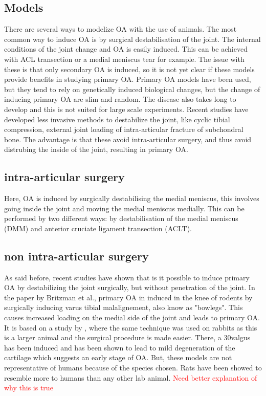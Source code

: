 \subsection{Models \cite{OA1} \cite{OA2}}

There are several ways to modelize OA with the use of animals. The most common way to induce OA is by surgical destabilisation of the joint. The internal conditions of the joint change and OA is easily induced. This can be achieved with ACL transection or a medial meniscus tear for example. The issue with these is that only secondary OA is induced, so it is not yet clear if these models provide benefits in studying primary OA. Primary OA models have been used, but they tend to rely on genetically induced biological changes, but the change of inducing primary OA are slim and random. The disease also takes long to develop and this is not suited for large scale experiments. Recent studies have developed less invasive methods to destabilize the joint, like cyclic tibial compression, external joint loading of intra-articular fracture of subchondral bone. The advantage is that these avoid intra-articular surgery, and thus avoid distrubing the inside of the joint, resulting in primary OA.

\subsection{intra-articular surgery\cite{OA2}}

Here, OA is induced by surgically destabilising the medial meniscus, this involves going inside the joint and moving the medial meniscus medially. This can be performed by two different ways: by destabilisation of the medial meniscus (DMM) and anterior cruciate ligament transection (ACLT). \cite{DMM}


\subsection{non intra-articular surgery\cite{OA1}}

As said before, recent studies have shown that is it possible to induce primary OA by destabilizing the joint surgically, but without penetration of the joint. In the paper by Britzman et al., primary OA in induced in the knee of rodents by surgically inducing varus tibial malalignement, also know as "bowlegs". This causes increased loading on the medial side of the joint and leads to primary OA. It is based on a study by \cite{rabbitOA}, where the same technique was used on rabbits as this is a larger animal and the surgical procedure is made easier. There, a 30\degree valgus has been induced and has been shown to lead to mild degeneration of the cartilage which suggests an early stage of OA. But, these models are not representative of humans because of the species chosen. Rats have been showed to resemble more to humans than any other lab animal. \textcolor{red}{Need better explanation of why this is true}

